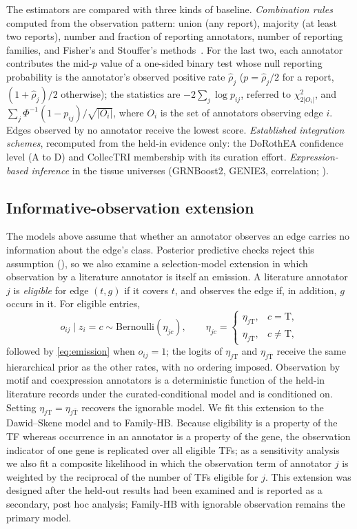 The estimators are compared with three kinds of baseline.
\emph{Combination rules} computed from the observation pattern: union (any report), majority (at least two reports), number and fraction of reporting annotators, number of reporting families, and Fisher's and Stouffer's methods~\citep{fisher1932statistical,stouffer1949american}. For the last two, each annotator contributes the mid-$p$ value of a one-sided binary test whose null reporting probability is the annotator's observed positive rate $\hat\rho_j$ ($p=\hat\rho_j/2$ for a report, $(1+\hat\rho_j)/2$ otherwise); the statistics are $-2\sum_j\log p_{ij}$, referred to $\chi^2_{2|O_i|}$, and $\sum_j\Phi^{-1}(1-p_{ij})/\sqrt{|O_i|}$, where $O_i$ is the set of annotators observing edge $i$. Edges observed by no annotator receive the lowest score.
\emph{Established integration schemes}, recomputed from the held-in evidence only: the DoRothEA confidence level (A to D) and CollecTRI membership with its curation effort.
\emph{Expression-based inference} in the tissue universes (GRNBoost2, GENIE3, correlation; ).

\subsection{Informative-observation extension}\label{sec:obsmodel}
The models above assume that whether an annotator observes an edge carries no information about the edge's class.
Posterior predictive checks reject this assumption (), so we also examine a selection-model extension in which observation by a literature annotator is itself an emission.
A literature annotator $j$ is \emph{eligible} for edge $(t,g)$ if it covers $t$, and observes the edge if, in addition, $g$ occurs in it. For eligible entries,
\begin{equation}
  o_{ij}\mid z_i=c \sim \mathrm{Bernoulli}(\eta_{jc}),\qquad \eta_{jc}=\begin{cases}\eta_{j\mathrm{T}}, & c=\mathrm{T},\\ \eta_{j\bar{\mathrm{T}}}, & c\neq \mathrm{T},\end{cases}
  \label{eq:obs}
\end{equation}
followed by \eqref{eq:emission} when $o_{ij}=1$; the logits of $\eta_{j\mathrm{T}}$ and $\eta_{j\bar{\mathrm{T}}}$ receive the same hierarchical prior as the other rates, with no ordering imposed.
Observation by motif and coexpression annotators is a deterministic function of the held-in literature records under the curated-conditional model and is conditioned on.
Setting $\eta_{j\mathrm{T}}=\eta_{j\bar{\mathrm{T}}}$ recovers the ignorable model.
We fit this extension to the Dawid--Skene model and to Family-HB.
Because eligibility is a property of the TF whereas occurrence in an annotator is a property of the gene, the observation indicator of one gene is replicated over all eligible TFs; as a sensitivity analysis we also fit a composite likelihood in which the observation term of annotator $j$ is weighted by the reciprocal of the number of TFs eligible for $j$.
This extension was designed after the held-out results had been examined and is reported as a secondary, post hoc analysis; Family-HB with ignorable observation remains the primary model.

